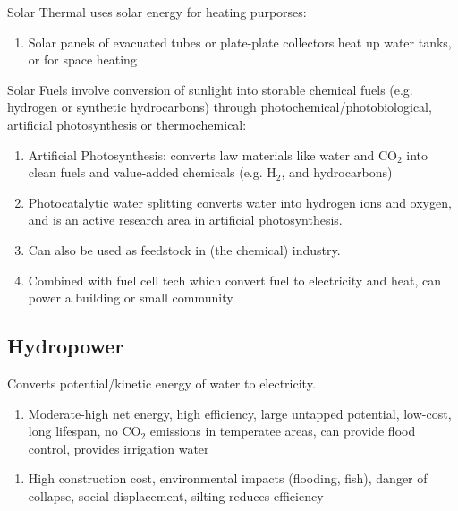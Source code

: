 \documentclass[12pt, a4paper]{article}
\begin{document}
\begin{multicols*}{3}
Solar Thermal uses solar energy for heating purporses:
\begin{enumerate}[\roman*.]
  \item Solar panels of evacuated tubes or plate-plate collectors heat up water tanks, or for space heating
\end{enumerate}

Solar Fuels involve conversion of sunlight into storable chemical fuels (e.g. hydrogen or synthetic hydrocarbons) through photochemical/photobiological, artificial photosynthesis or thermochemical:
\begin{enumerate}[\roman*.]
  \item Artificial Photosynthesis: converts law materials like water and CO$_2$ into clean fuels and value-added chemicals (e.g. H$_2$, and hydrocarbons) 
  \item Photocatalytic water splitting converts water into hydrogen ions and oxygen, and is an active research area in artificial photosynthesis.
  \item Can also be used as feedstock in (the chemical) industry.
  \item Combined with fuel cell tech which convert fuel to electricity and heat, can power a building or small community
\end{enumerate}
\colbreak

\subsection{Hydropower}
Converts potential/kinetic energy of water to electricity.
\begin{enumerate}[$+$]
  \item Moderate-high net energy, high efficiency, large untapped potential, low-cost, long lifespan, no CO$_2$ emissions in temperatee areas, can provide flood control, provides irrigation water
\end{enumerate}\vspace{-1pt}
\begin{enumerate}[$-$]
  \item High construction cost, environmental impacts (flooding, fish), danger of collapse, social displacement, silting reduces efficiency 
\end{enumerate}


\end{multicols*}
\end{document}
